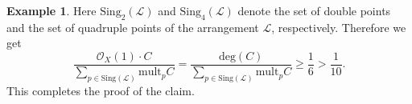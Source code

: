 \documentclass[12pt,reqno]{amsart}
\theoremstyle{plain}
\numberwithin{equation}{section}
\theoremstyle{definition}
\newtheorem{example}[theorem]{Example}
\begin{document}
\begin{example}
		\iffalse
		Using the sets  $\mathcal{L}_1$, $\mathcal{L}_2$, \ldots, $\mathcal{L}_{24}$  constructed above, we obtain
		\begin{eqnarray*}
	\sum\limits_{i=1}^{48} C \cdot l_i &\geq& 2\sum\limits_{p\in \text{Sing}(\mathcal{L})} \text{mult}_pC \\ 
		\Longrightarrow \sum\limits_{1}^{24} \mathcal{O}_X(1) \cdot C  &\geq& 2\sum\limits_{p\in \text{Sing}(\mathcal{L})} \text{mult}_pC \\ 
		\Longrightarrow 24 \text{deg}(C) &\geq& 2 \left(2\sum\limits_{p_i \in \text{Sing}_2(\mathcal{L})} \text{mult}_{p_i} C ~+~ 4\sum\limits_{p_j \in \text{Sing}_4(\mathcal{L})} \text{mult}_{p_j}C \right) \\
		\Longrightarrow 24 \text{deg}(C) &\geq& 4 \sum\limits_{p \in C\cap \text{Sing}(\mathcal{L})} \text{mult}_{p}C \\
		\Longrightarrow 6 \text{deg}(C) &\geq&  \sum\limits_{p \in C\cap \text{Sing}(\mathcal{L})} \text{mult}_{p}C.
		\end{eqnarray*}
		\fi
		
		
		Here $\text{Sing}_2(\mathcal{L})$ and $\text{Sing}_4(\mathcal{L})$ denote the set of double points and the set of quadruple points of the arrangement $\mathcal{L}$, respectively. Therefore we get 
		\[
		\frac{\mathcal{O}_X(1) \cdot C}{\sum\limits_{p \in \text{Sing}(\mathcal{L})} \text{mult}_{p}C} = \frac{\text{deg}(C)}{ \sum\limits_{p \in\text{Sing}(\mathcal{L})} \text{mult}_{p}C} \geq \frac{1}{6} > \frac{1}{10}.
		\]
		This completes the proof of the claim.

		
		
	\end{example}
			
\end{document}
